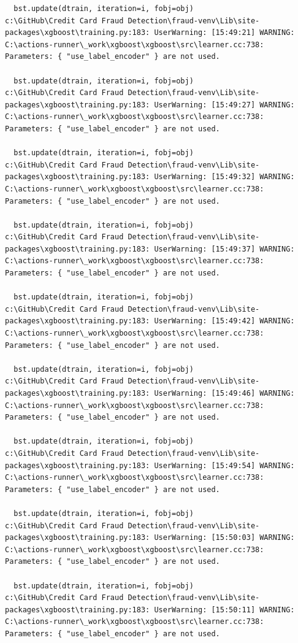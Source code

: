 \documentclass[
  letterpaper,
  DIV=11,
  numbers=noendperiod]{scrartcl}
\begin{document}
\begin{verbatim}
  bst.update(dtrain, iteration=i, fobj=obj)
c:\GitHub\Credit Card Fraud Detection\fraud-venv\Lib\site-packages\xgboost\training.py:183: UserWarning: [15:49:21] WARNING: C:\actions-runner\_work\xgboost\xgboost\src\learner.cc:738: 
Parameters: { "use_label_encoder" } are not used.

  bst.update(dtrain, iteration=i, fobj=obj)
c:\GitHub\Credit Card Fraud Detection\fraud-venv\Lib\site-packages\xgboost\training.py:183: UserWarning: [15:49:27] WARNING: C:\actions-runner\_work\xgboost\xgboost\src\learner.cc:738: 
Parameters: { "use_label_encoder" } are not used.

  bst.update(dtrain, iteration=i, fobj=obj)
c:\GitHub\Credit Card Fraud Detection\fraud-venv\Lib\site-packages\xgboost\training.py:183: UserWarning: [15:49:32] WARNING: C:\actions-runner\_work\xgboost\xgboost\src\learner.cc:738: 
Parameters: { "use_label_encoder" } are not used.

  bst.update(dtrain, iteration=i, fobj=obj)
c:\GitHub\Credit Card Fraud Detection\fraud-venv\Lib\site-packages\xgboost\training.py:183: UserWarning: [15:49:37] WARNING: C:\actions-runner\_work\xgboost\xgboost\src\learner.cc:738: 
Parameters: { "use_label_encoder" } are not used.

  bst.update(dtrain, iteration=i, fobj=obj)
c:\GitHub\Credit Card Fraud Detection\fraud-venv\Lib\site-packages\xgboost\training.py:183: UserWarning: [15:49:42] WARNING: C:\actions-runner\_work\xgboost\xgboost\src\learner.cc:738: 
Parameters: { "use_label_encoder" } are not used.

  bst.update(dtrain, iteration=i, fobj=obj)
c:\GitHub\Credit Card Fraud Detection\fraud-venv\Lib\site-packages\xgboost\training.py:183: UserWarning: [15:49:46] WARNING: C:\actions-runner\_work\xgboost\xgboost\src\learner.cc:738: 
Parameters: { "use_label_encoder" } are not used.

  bst.update(dtrain, iteration=i, fobj=obj)
c:\GitHub\Credit Card Fraud Detection\fraud-venv\Lib\site-packages\xgboost\training.py:183: UserWarning: [15:49:54] WARNING: C:\actions-runner\_work\xgboost\xgboost\src\learner.cc:738: 
Parameters: { "use_label_encoder" } are not used.

  bst.update(dtrain, iteration=i, fobj=obj)
c:\GitHub\Credit Card Fraud Detection\fraud-venv\Lib\site-packages\xgboost\training.py:183: UserWarning: [15:50:03] WARNING: C:\actions-runner\_work\xgboost\xgboost\src\learner.cc:738: 
Parameters: { "use_label_encoder" } are not used.

  bst.update(dtrain, iteration=i, fobj=obj)
c:\GitHub\Credit Card Fraud Detection\fraud-venv\Lib\site-packages\xgboost\training.py:183: UserWarning: [15:50:11] WARNING: C:\actions-runner\_work\xgboost\xgboost\src\learner.cc:738: 
Parameters: { "use_label_encoder" } are not used.


\end{verbatim}
\end{document}
